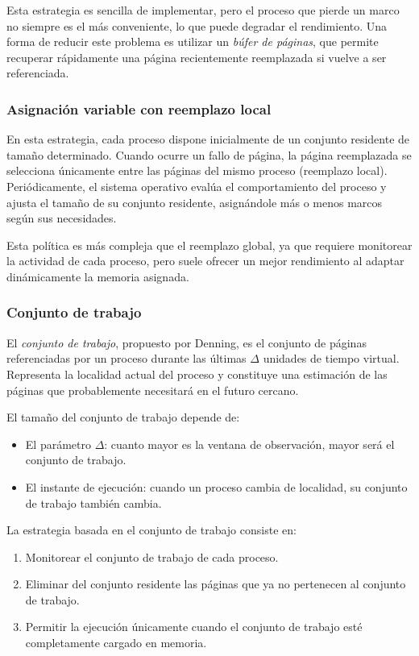 Esta estrategia es sencilla de implementar, pero el proceso que pierde un marco no siempre es el más conveniente, lo que puede degradar el rendimiento. Una forma de reducir este problema es utilizar un \textit{búfer de páginas}, que permite recuperar rápidamente una página recientemente reemplazada si vuelve a ser referenciada.

\subsubsection{Asignación variable con reemplazo local}

En esta estrategia, cada proceso dispone inicialmente de un conjunto residente de tamaño determinado. Cuando ocurre un fallo de página, la página reemplazada se selecciona únicamente entre las páginas del mismo proceso (reemplazo local). Periódicamente, el sistema operativo evalúa el comportamiento del proceso y ajusta el tamaño de su conjunto residente, asignándole más o menos marcos según sus necesidades.

Esta política es más compleja que el reemplazo global, ya que requiere monitorear la actividad de cada proceso, pero suele ofrecer un mejor rendimiento al adaptar dinámicamente la memoria asignada.

\subsubsection{Conjunto de trabajo}

El \textit{conjunto de trabajo}, propuesto por Denning, es el conjunto de páginas referenciadas por un proceso durante las últimas \(\Delta\) unidades de tiempo virtual. Representa la localidad actual del proceso y constituye una estimación de las páginas que probablemente necesitará en el futuro cercano.

El tamaño del conjunto de trabajo depende de:
\begin{itemize}
  \item El parámetro \(\Delta\): cuanto mayor es la ventana de observación, mayor será el conjunto de trabajo.
  \item El instante de ejecución: cuando un proceso cambia de localidad, su conjunto de trabajo también cambia.
\end{itemize}
La estrategia basada en el conjunto de trabajo consiste en:
\begin{enumerate}
  \item Monitorear el conjunto de trabajo de cada proceso.
  \item Eliminar del conjunto residente las páginas que ya no pertenecen al conjunto de trabajo.
  \item Permitir la ejecución únicamente cuando el conjunto de trabajo esté completamente cargado en memoria.
\end{enumerate}

